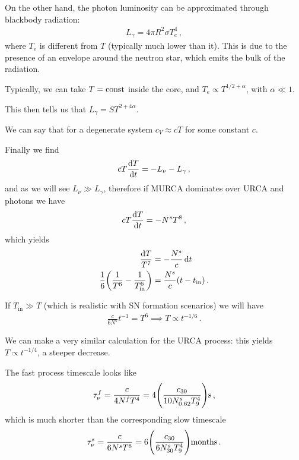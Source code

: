 \documentclass[main.tex]{subfiles}
\begin{document}
On the other hand, the photon luminosity can be approximated through blackbody radiation: 
%
\begin{align}
L_\gamma = 4 \pi R^2 \sigma T_e^4
\,,
\end{align}
%
where \(T_e\) is different from \(T\) (typically much lower than it). 
This is due to the presence of an envelope around the neutron star, which emits the bulk of the radiation. 

Typically, we can take \(T = \text{const}\) inside the core, and \(T_e \propto T^{1/2 + \alpha }\), with \(\alpha \ll 1\). 

This then tells us that \(L_\gamma = S T^{2 + 4 \alpha }\). 

We can say that for a degenerate system \(c_V \approx c T\) for some constant \(c\). 

Finally we find 
%
\begin{align}
c T \dv{T}{t} = - L_\nu - L_\gamma 
\,,
\end{align}
%
and as we will see \(L_\nu \gg  L_\gamma \), therefore if MURCA dominates over URCA and photons we have 
%
\begin{align}
cT \dv{T}{t} = - N^{s} T^{8}
\,,
\end{align}
%
which yields 
%
\begin{align}
\frac{ \dd{T}}{T^{7}} &= - \frac{N^{s}}{c} \dd{t}  \\
\frac{1}{6} \qty( \frac{1}{T^{6}} - \frac{1}{T _{\text{in}}^{6}}) &= \frac{N^{s}}{c} (t - t _{\text{in}})
\,.
\end{align}

If \(T _{\text{in}} \gg T\) (which is realistic with SN formation scenarios) we will have 
%
\begin{align}
\frac{c}{6 N^{s}} t^{-1} = T^{6} \implies T \propto t^{-1/6}
\,.
\end{align}

We can make a very similar calculation for the URCA process: this yields  \(T \propto t^{-1/4}\), a steeper decrease. 

The fast process timescale looks like 
%
\begin{align}
\tau^f_\nu = \frac{c}{4 N^{f} T^{4}} = 4 \qty(\frac{c_{30}}{10 N^{s}_{\num{.62}} T^{4}_9}) \SI{}{s}
\,,
\end{align}
%
which is much shorter than the corresponding slow timescale 
%
\begin{align}
\tau^s_\nu = \frac{c}{6 N^{s} T^{6}}  = 6 \qty(\frac{c_{30}}{6 N_{30}^{s} T^{4}_9}) \SI{}{months}
\,.
\end{align}
\end{document}
